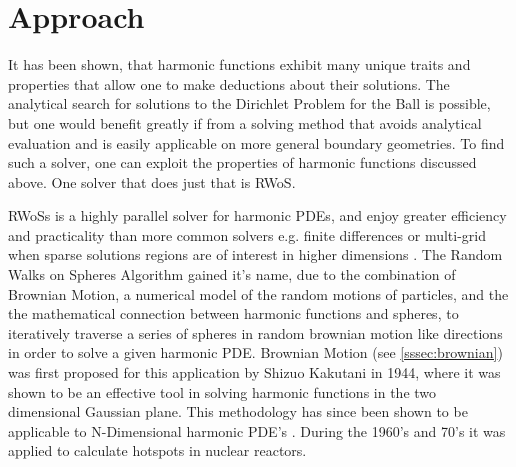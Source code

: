 \section{Approach}
It has been shown, that harmonic functions exhibit many unique traits and properties
that allow one to make deductions about their solutions.  The analytical search for solutions to
the Dirichlet Problem for the Ball is possible, but one would benefit greatly if
from a solving method that avoids analytical evaluation and is easily applicable on more
general boundary geometries.  To find such a solver, one can exploit the properties
of harmonic functions discussed above.  One solver that does just that is \Gls{RWoS}.
\par
 \Glspl{RWoS} is a highly parallel solver for harmonic \Glspl{PDE}, %
and enjoy greater efficiency and practicality than more common solvers e.g.
finite differences or multi-grid when sparse solutions regions are of
interest in higher dimensions \cite{DeLaurentis}\cite{Bornemann}\cite{Yang}.  The Random Walks on Spheres Algorithm
gained it's name, due to the combination of Brownian Motion, a numerical model
of the random motions of particles, and the the mathematical connection between
harmonic functions and spheres\cite{Axler1992}, to iteratively traverse a series %
of spheres in random brownian motion like directions %
in order to solve a given harmonic PDE\cite{DeLaurentis}.
Brownian Motion (see \ref{sssec:brownian}) was first %
proposed for this application by Shizuo Kakutani in 1944\cite{kakutani},
where it was shown to be an effective tool
in solving harmonic functions in the two dimensional Gaussian plane.  This methodology has since been
shown to be applicable to N-Dimensional harmonic PDE's \cite{DeLaurentis}.  During the 1960's
and 70's it was applied to calculate hotspots in nuclear reactors\cite{Bornemann}.

